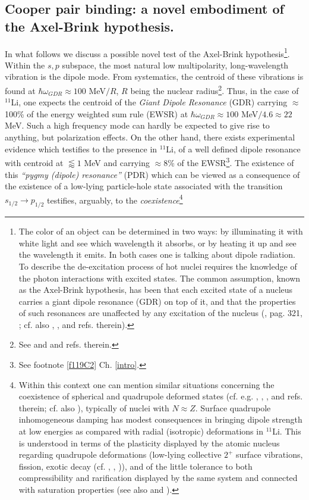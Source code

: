 \subsection{Cooper pair binding: a novel embodiment of the Axel-Brink hypothesis.}\label{sect1F1}
In what follows we discuss a possible novel test of the Axel-Brink hypothesis\footnote{The color of an object can be determined in two ways: by illuminating it with white light and see which wavelength it absorbs, or by heating it up and see the  wavelength it emits. In both cases one is talking about dipole radiation. To describe the de-excitation process of hot nuclei requires the knowledge of the photon interactions with excited states. The common assumption, known as the Axel-Brink hypothesis, has been that each excited state of a nucleus carries a giant dipole resonance (GDR) on top of it, and that the properties of such resonances are unaffected by any excitation of the nucleus (\cite{Brink:55}, \cite{Lynn:68} pag. 321, \cite{Axel:62}; cf. also \cite{Bertsch:86}, \cite{Bortignon:98}, \cite{Martin:17} and refs. therein).}. Within the $s,p$ subspace, the most natural low multipolarity, long-wavelength vibration is the dipole mode. From systematics, the centroid of these vibrations is found at $\hbar \omega_{GDR}\approx 100$ MeV$/R$, $R$ being the nuclear radius\footnote{See \cite{Bohr:75} \cite{Bortignon:98} and \cite{Bertsch:05} and refs. therein.}. Thus, in the case of $^{11}$Li, one expects the centroid of the \textit{Giant Dipole Resonance} (GDR) carrying $\approx$100\% of the energy weighted sum rule (EWSR) at $\hbar \omega_{GDR}\approx 100$ MeV$/4.6\approx 22$ MeV. Such a high frequency mode can hardly be expected to give rise to anything, but polarization effects. On the other hand, there exists experimental evidence which testifies to the presence in $^{11}$Li, of a well defined dipole resonance with centroid at $\lessapprox1$ MeV and carrying $\approx 8$\% of the EWSR\footnote{See footnote \ref{f119C2} Ch. \ref{intro}.}. The existence of this \textit{``pygmy (dipole) resonance''} (PDR) 
 which can be viewed as a  consequence of the existence of a low-lying particle-hole state associated with the transition $s_{1/2}\rightarrow p_{1/2}$ testifies, arguably, to the \textit{coexistence}\footnote{Within this context one can mention similar situations concerning the coexistence of spherical and quadrupole deformed states (cf. e.g. \cite{Wimmer:10}, \cite{Federman:65}, \cite{Federman:66}, \cite{Donau:67} and refs. therein; cf. also \cite{Bohr:63}), typically of nuclei with $N\approx Z$. Surface quadrupole inhomogeneous damping has modest consequences in bringing dipole strength at low energies as compared with radial (isotropic) deformations in $^{11}$Li. This is understood in terms of the plasticity   displayed by the atomic nucleus regarding quadrupole deformations (low-lying collective $2^+$ surface vibrations, fission, exotic decay (cf. \cite{Barranco:88}, \cite{Barranco:89,Bertsch:88b}, \cite{Bertsch:87})), and of the little tolerance to both compressibility and rarification displayed by the same system and connected with saturation properties (see also \cite{Broglia:19} and \cite{Broglia:19b}).} 
